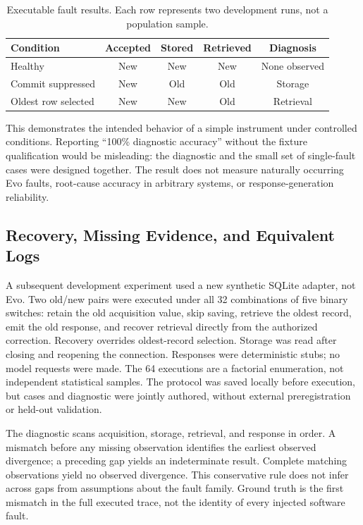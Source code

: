 \documentclass[runningheads]{llncs}
\begin{document}
\begin{table}[t]
\caption{Executable fault results. Each row represents two development runs, not a population sample.}\label{tab:faults}
\small
\begin{tabular}{p{3.0cm}cccc}
\toprule
Condition & Accepted & Stored & Retrieved & Diagnosis \\
\midrule
Healthy & New & New & New & None observed \\
Commit suppressed & New & Old & Old & Storage \\
Oldest row selected & New & New & Old & Retrieval \\
\bottomrule
\end{tabular}
\end{table}

This demonstrates the intended behavior of a simple instrument under controlled conditions. Reporting ``100\% diagnostic accuracy'' without the fixture qualification would be misleading: the diagnostic and the small set of single-fault cases were designed together. The result does not measure naturally occurring Evo faults, root-cause accuracy in arbitrary systems, or response-generation reliability.

\subsection{Recovery, Missing Evidence, and Equivalent Logs}
A subsequent development experiment used a new synthetic SQLite adapter, not Evo. Two old/new pairs were executed under all 32 combinations of five binary switches: retain the old acquisition value, skip saving, retrieve the oldest record, emit the old response, and recover retrieval directly from the authorized correction. Recovery overrides oldest-record selection. Storage was read after closing and reopening the connection. Responses were deterministic stubs; no model requests were made. The 64 executions are a factorial enumeration, not independent statistical samples. The protocol was saved locally before execution, but cases and diagnostic were jointly authored, without external preregistration or held-out validation.

The diagnostic scans acquisition, storage, retrieval, and response in order. A mismatch before any missing observation identifies the earliest observed divergence; a preceding gap yields an indeterminate result. Complete matching observations yield no observed divergence. This conservative rule does not infer across gaps from assumptions about the fault family. Ground truth is the first mismatch in the full executed trace, not the identity of every injected software fault.
\end{document}
